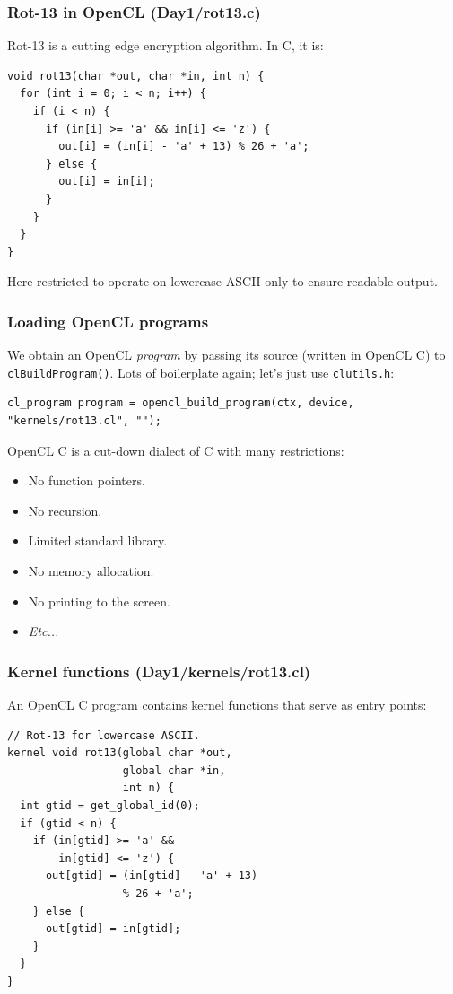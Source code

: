 \documentclass{beamer}
\begin{document}
\begin{frame}[fragile]
  \frametitle{Rot-13 in OpenCL (Day1/rot13.c)}

Rot-13 is a cutting edge encryption algorithm.  In C, it is:

\begin{lstlisting}
void rot13(char *out, char *in, int n) {
  for (int i = 0; i < n; i++) {
    if (i < n) {
      if (in[i] >= 'a' && in[i] <= 'z') {
        out[i] = (in[i] - 'a' + 13) % 26 + 'a';
      } else {
        out[i] = in[i];
      }
    }
  }
}
\end{lstlisting}

Here restricted to operate on lowercase ASCII only to ensure readable
output.

\end{frame}

\begin{frame}[fragile]
  \frametitle{Loading OpenCL programs}

  We obtain an OpenCL \textit{program} by passing its source (written
  in OpenCL C) to \texttt{clBuildProgram()}.  Lots of boilerplate
  again; let's just use \texttt{clutils.h}:

\begin{lstlisting}
cl_program program = opencl_build_program(ctx, device, "kernels/rot13.cl", "");
\end{lstlisting}

  OpenCL C is a cut-down dialect of C with many restrictions:

  \begin{itemize}
  \item No function pointers.
  \item No recursion.
  \item Limited standard library.
  \item No memory allocation.
  \item No printing to the screen.
  \item \textit{Etc...}
  \end{itemize}
\end{frame}

\begin{frame}[fragile]
  \frametitle{Kernel functions (Day1/kernels/rot13.cl)}

  An OpenCL C program contains kernel functions that serve as
  entry points:

\begin{lstlisting}
// Rot-13 for lowercase ASCII.
kernel void rot13(global char *out,
                  global char *in,
                  int n) {
  int gtid = get_global_id(0);
  if (gtid < n) {
    if (in[gtid] >= 'a' &&
        in[gtid] <= 'z') {
      out[gtid] = (in[gtid] - 'a' + 13)
                  % 26 + 'a';
    } else {
      out[gtid] = in[gtid];
    }
  }
}
\end{lstlisting}
\end{frame}
\end{document}
